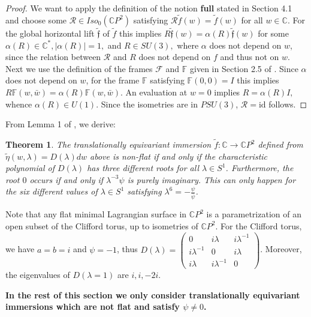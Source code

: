 \documentclass[a4paper,11pt]{amsart}
\newtheorem{theorem}{Theorem}[section]
\theoremstyle{definition}
\numberwithin{equation}{section}
\newcommand{\C}{\mathbb{C}}
\newcommand{\F}{\mathbb{F}}
\newcommand{\f}{\mathfrak{f}}
\begin{document}
\begin{proof}  
We want to apply the definition of the notion {\bf full} stated in Section 4.1 and choose some 
$\mathcal{R} \in Iso_0(\C P^2)$ satisfying $\mathcal{R} \tilde{f}(w) = \tilde{f}(w)$ for all $w \in \C$.
For the global horizontal lift $\tilde{\f}$ of $\tilde{f}$ this implies 
$R \tilde{\f}(w) = \alpha(R)\tilde{\f}(w)$ for some   
$ \alpha(R)  \in \C^*, |  \alpha(R) | = 1, $ and $R \in SU(3),$ where $\alpha$ does not depend on $w$, 
 since the relation between $\mathcal{R}$ and $R$ does not depend on $f$ and thus not on $w$.
  Next we use the definition of the frames $\mathcal{F}$ and $\F$ given in Section 2.5 of  \cite{DoMaB1}. 
  Since $\alpha$ does not depend on $w$, for the frame $\F$ satisfying $\F(0,0) = I$ this implies
 $R \F(w, \bar w) = \alpha(R)\F(w, \bar w) $.  An evaluation at $w = 0$ implies $R  = \alpha(R) I,$ whence 
 $\alpha (R) \in U(1)$.
 Since the isometries are in $PSU(3)$, $\mathcal{R} =\mathrm{id}$ follows. 
\end{proof}


From Lemma 1 of \cite{DoMaNL},  we derive:

\begin{theorem}
The translationally equivariant immersion $\tilde{f}: \C \rightarrow \C P^2$ defined from 
$\tilde{\eta}(w,\lambda) = D(\lambda) dw$ above is non-flat if and only if the characteristic 
polynomial  of $D(\lambda)$ has three different roots for all $\lambda \in S^1$.
Furthermore, 
the root $0$ occurs if and only if 
$\lambda^{-3} \psi $ is purely imaginary. This can only happen for 
 the six different values of $\lambda \in S^1$  satisfying $\lambda^6 = - \frac{\psi}{\bar \psi}$.
\end{theorem}

Note that any flat minimal Lagrangian surface in $\mathbb{C}P^2$ is a parametrization of an open subset of the Clifford torus, up to isometries of $\mathbb{C}P^2$. 
For the Clifford torus, we have $a=b=i$ and $\psi=-1$, thus 
$D(\lambda)=\begin{pmatrix}
0&i\lambda & i\lambda^{-1}\\
i\lambda^{-1}& 0& i\lambda \\
i \lambda & i\lambda^{-1} & 0
\end{pmatrix}$. 
Moreover, the eigenvalues of $D(\lambda=1)$ are $i, i, -2i$. 



{\bf In the rest of this section we only consider translationally equivariant 
immersions which are not flat and satisfy $\psi \neq 0$.}
\end{document}
